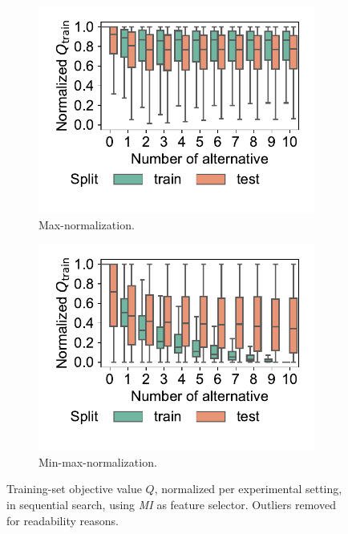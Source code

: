 \documentclass{article}
\theoremstyle{definition}
\begin{document}
\begin{figure}[htb]
	\centering
	\begin{subfigure}{0.48\textwidth}
		\centering
		\includegraphics[width=\textwidth, trim=15 25 15 15, clip]{plots/impact-num-alternatives-objective-max.pdf}
		\caption{Max-normalization.}
		\label{fig:afs:impact-num-alternatives-objective-max}
	\end{subfigure}
	\hfill
	\begin{subfigure}{0.48\textwidth}
		\centering
		\includegraphics[width=\textwidth, trim=15 25 15 15, clip]{plots/impact-num-alternatives-objective-min-max.pdf}
		\caption{Min-max-normalization.}
		\label{fig:afs:impact-num-alternatives-objective-min-max}
	\end{subfigure}
	\caption{Training-set objective value $Q$, normalized per experimental setting, in sequential search, using \emph{MI} as feature selector.
	Outliers removed for readability reasons.}
	\label{fig:afs:impact-num-alternatives-objective}
\end{figure}
\end{document}
